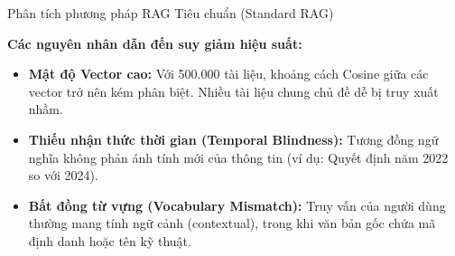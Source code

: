 \documentclass[aspectratio=169, xcolor=table]{beamer}
\begin{document}
\begin{frame}{Phân tích phương pháp RAG Tiêu chuẩn (Standard RAG)}
    \begin{center}
    \end{center}
    
    \vspace{0.3cm}
    
    \textbf{Các nguyên nhân dẫn đến suy giảm hiệu suất:}
    \vspace{0.1cm}
    \begin{itemize}
        \item[\faTimesCircle] \textbf{Mật độ Vector cao:} Với 500.000 tài liệu, khoảng cách Cosine giữa các vector trở nên kém phân biệt. Nhiều tài liệu chung chủ đề dễ bị truy xuất nhầm.
        \item[\faTimesCircle] \textbf{Thiếu nhận thức thời gian (Temporal Blindness):} Tương đồng ngữ nghĩa không phản ánh tính mới của thông tin (ví dụ: Quyết định năm 2022 so với 2024).
        \item[\faTimesCircle] \textbf{Bất đồng từ vựng (Vocabulary Mismatch):} Truy vấn của người dùng thường mang tính ngữ cảnh (contextual), trong khi văn bản gốc chứa mã định danh hoặc tên kỹ thuật.
    \end{itemize}
\end{frame}
\end{document}
